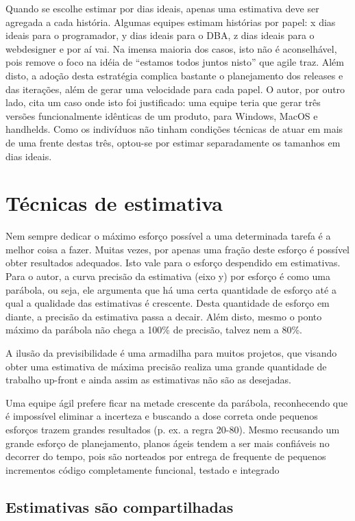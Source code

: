 \documentclass[a4paper,abntfigtabnum,noindentfirst]{abnt}
\begin{document}
Quando se escolhe estimar por dias ideais, apenas uma estimativa deve ser agregada a cada história. Algumas equipes estimam histórias por papel: x dias ideais para o programador, y dias ideais para o DBA, z dias ideais para o webdesigner e por aí vai. Na imensa maioria dos casos, isto não é aconselhável, pois remove o foco na idéia de ``estamos todos juntos nisto'' que agile traz. Além disto, a adoção desta estratégia complica bastante o planejamento dos releases e das iterações, além de gerar uma velocidade para cada papel. O autor, por outro lado, cita um caso onde isto foi justificado: uma equipe teria que gerar três versões funcionalmente idênticas de um produto, para Windows, MacOS e handhelds. Como os indivíduos não tinham condições técnicas de atuar em mais de uma frente destas três, optou-se por estimar separadamente os tamanhos em dias ideais.



\chapter{Técnicas de estimativa}

Nem sempre dedicar o máximo esforço possível a uma determinada tarefa é a melhor coisa a fazer. Muitas vezes, por apenas uma fração deste esforço é possível obter resultados adequados. Isto vale para o esforço despendido em estimativas. Para o autor, a curva precisão da estimativa (eixo y) por esforço é como uma parábola, ou seja, ele argumenta que há uma certa quantidade de esforço até a qual a qualidade das estimativas é crescente. Desta quantidade de esforço em diante, a precisão da estimativa passa a decair. Além disto, mesmo o ponto máximo da parábola não chega a 100\% de precisão, talvez nem a 80\%.

A ilusão da previsibilidade é uma armadilha para muitos projetos, que visando obter uma estimativa de máxima precisão realiza uma grande quantidade de trabalho up-front e ainda assim as estimativas não são as desejadas.

Uma equipe ágil prefere ficar na metade crescente da parábola, reconhecendo que é impossível eliminar a incerteza e buscando a dose correta onde pequenos esforços trazem grandes resultados (p. ex. a regra 20-80). Mesmo recusando um grande esforço de planejamento, planos ágeis tendem a ser mais confiáveis no decorrer do tempo, pois são norteados por entrega de frequente de pequenos incrementos código completamente funcional, testado e integrado

\section{Estimativas são compartilhadas}
\end{document}
